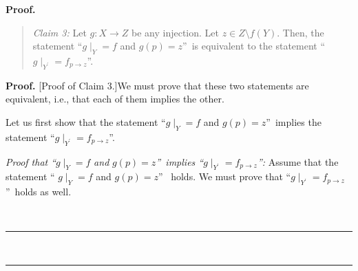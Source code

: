 \documentclass[numbers=enddot,12pt,final,onecolumn,notitlepage]{scrartcl}%
\numberwithin{exer}{section}
\theoremstyle{definition}
\newenvironment{statement}{\begin{quote}}{\end{quote}}
\newenvironment{proof}[1][Proof]{\noindent\textbf{#1.} }{\ \rule{0.5em}{0.5em}}
\newenvironment{verlong}{}{}
\begin{document}
\begin{verlong}
\begin{proof}
\begin{statement}
\textit{Claim 3:} Let $g:X\rightarrow Z$ be any injection. Let $z\in
Z\setminus f\left(  Y\right)  $. Then, the statement \textquotedblleft$\left.
g\mid_{Y}\right.  =f$ and $g\left(  p\right)  =z$\textquotedblright\ is
equivalent to the statement \textquotedblleft$\left.  g\mid_{Y^{\prime}%
}\right.  =f_{p\rightarrow z}$\textquotedblright.
\end{statement}

\begin{proof}
[Proof of Claim 3.]We must prove that these two statements are equivalent,
i.e., that each of them implies the other.

Let us first show that the statement \textquotedblleft$\left.  g\mid
_{Y}\right.  =f$ and $g\left(  p\right)  =z$\textquotedblright\ implies the
statement \textquotedblleft$\left.  g\mid_{Y^{\prime}}\right.
=f_{p\rightarrow z}$\textquotedblright.

\textit{Proof that \textquotedblleft}$\left.  g\mid_{Y}\right.  =f$\textit{
and }$g\left(  p\right)  =z$\textit{\textquotedblright\ implies
\textquotedblleft}$\left.  g\mid_{Y^{\prime}}\right.  =f_{p\rightarrow z}%
$\textit{\textquotedblright:} Assume that the statement \textquotedblleft%
$\left.  g\mid_{Y}\right.  =f$ and $g\left(  p\right)  =z$\textquotedblright%
\ holds. We must prove that \textquotedblleft$\left.  g\mid_{Y^{\prime}%
}\right.  =f_{p\rightarrow z}$\textquotedblright\ holds as well.


\end{proof}
\end{proof}
\end{verlong}
\end{document}
